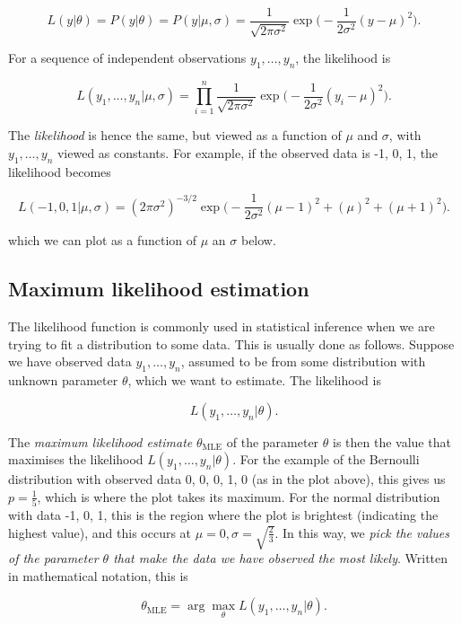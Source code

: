 \documentclass[11pt]{article}
\begin{document}
\[
L(y | \theta) = P(y | \theta) = P(y | \mu, \sigma) = \frac{1}{\sqrt{2 \pi \sigma^2}} \exp \Big( - \frac{1}{2 \sigma^2} (y - \mu)^2 \Big).
\]

For a sequence of independent observations \(y_1, \ldots, y_n\), the
likelihood is

\[
L(y_1, \ldots, y_n | \mu, \sigma) = \prod_{i=1}^n \frac{1}{\sqrt{2 \pi \sigma^2}} \exp \Big( - \frac{1}{2 \sigma^2} (y_i - \mu)^2 \Big).
\]

The \emph{likelihood} is hence the same, but viewed as a function of
\(\mu\) and \(\sigma\), with \(y_1, \ldots, y_n\) viewed as constants.
For example, if the observed data is -1, 0, 1, the likelihood becomes

\[
L(-1, 0, 1 | \mu, \sigma) = (2 \pi \sigma^2)^{-3/2} \exp \Big( - \frac{1}{2 \sigma^2} (\mu-1)^2 + (\mu)^2 + (\mu+1)^2 \Big).
\]

which we can plot as a function of \(\mu\) an \(\sigma\) below.

    \hypertarget{maximum-likelihood-estimation}{%
\subsection{Maximum likelihood
estimation}\label{maximum-likelihood-estimation}}

The likelihood function is commonly used in statistical inference when
we are trying to fit a distribution to some data. This is usually done
as follows. Suppose we have observed data \(y_1, \ldots, y_n\), assumed
to be from some distribution with unknown parameter \(\theta\), which we
want to estimate. The likelihood is

\[
L(y_1, \ldots, y_n | \theta).
\]

The \emph{maximum likelihood estimate} \(\theta_{\text{MLE}}\) of the
parameter \(\theta\) is then the value that maximises the likelihood
\(L(y_1, \ldots, y_n | \theta)\). For the example of the Bernoulli
distribution with observed data 0, 0, 0, 1, 0 (as in the plot above),
this gives us \(p=\frac{1}{5}\), which is where the plot takes its
maximum. For the normal distribution with data -1, 0, 1, this is the
region where the plot is brightest (indicating the highest value), and
this occurs at \(\mu=0, \sigma=\sqrt{\frac{2}{3}}\). In this way, we
\emph{pick the values of the parameter \(\theta\) that make the data we
have observed the most likely}. Written in mathematical notation, this
is

\[
\theta_{\text{MLE}} = \arg \max_{\theta} L(y_1, \ldots, y_n | \theta).
\]
\end{document}
